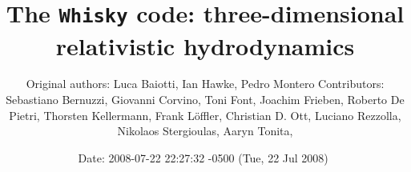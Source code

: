 \documentclass{article}
\begin{document}
\title{The {\tt Whisky} code: three-dimensional relativistic hydrodynamics}

\author{Original authors: Luca Baiotti, Ian Hawke, Pedro Montero \cr Contributors: 
  Sebastiano Bernuzzi, Giovanni Corvino, Toni Font, Joachim Frieben, \cr Roberto De Pietri, Thorsten
  Kellermann, Frank L\"offler, Christian D. Ott, \cr Luciano Rezzolla, Nikolaos Stergioulas, Aaryn
  Tonita,   }

\date{$ $Date: 2008-07-22 22:27:32 -0500 (Tue, 22 Jul 2008) $ $}
\maketitle
\end{document}
